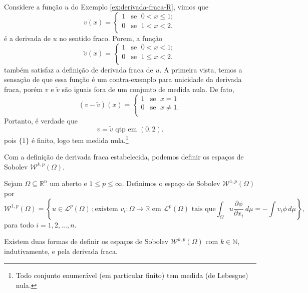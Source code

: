 \documentclass[a4paper, 11pt]{book}
\theoremstyle{definition}
\newcommand{\bN}{\mathbb{N}}
\newcommand{\bR}{\mathbb{R}}
\newcommand{\cL}{\mathcal{L}}
\newcommand{\cW}{\mathcal{W}}
\begin{document}
\begin{ex}
    Considere a função $u$ do Exemplo \ref{ex:derivada-fraca-R}, vimos que
    \[
        v(x) = \left\{
            \begin{array}{rl}
                1 & \text{se }\; 0 < x \leqslant 1;\\
                0 & \text{se }\; 1 < x < 2.\\
            \end{array}
        \right.
    \]
    é a derivada de $u$ no sentido fraco.
    Porem, a função
    \[
        \tilde v(x) = \left\{
            \begin{array}{rl}
                1 & \text{se }\; 0 < x < 1;\\
                0 & \text{se }\; 1 \leqslant x < 2.\\
            \end{array}
        \right.
    \]
    também satisfaz a definição de derivada fraca de $u$.
    A primeira vista, temos a sensação de que essa função é um contra-exemplo para unicidade da derivada fraca, porém $v$ e $\tilde v$ são iguais fora de um conjunto de medida nula.
    De fato,
    \[
        (v - \tilde v)(x) = \left\{
            \begin{array}{rl}
                1 & \text{se }\; x = 1\\
                0 & \text{se }\; x \neq 1.\\
            \end{array}
        \right.
    \]
    Portanto, é verdade que
    \[
        v = \tilde v \text{ qtp em } (0,2).
    \]
    pois $\{1\}$ é finito, logo tem medida nula.\footnote{Todo conjunto enumerável (em particular finito) tem medida (de Lebesgue) nula.}
\end{ex}

Com a definição de derivada fraca estabelecida, podemos definir os espaços de Sobolev $\cW^{k,p}(\Omega)$.

\begin{dbox}
    Sejam $\Omega \subseteq \bR^n$ um aberto e $1 \leqslant p \leqslant \infty$. 
    Definimos o espaço de Sobolev $\cW^{1,p}(\Omega)$ por
    \[
        \cW^{1,p}(\Omega) = \left\{u \in \cL^p(\Omega) \,; \text{existem } v_i : \Omega \to \bR \text{ em $\cL^p(\Omega)$ tais que} \int_\Omega u \dfrac{\partial \phi}{\partial x_i} \, d\mu = -\!\!\int v_i \phi \,d\mu \right\},
    \]
    para todo $i = 1,2,\dots,n$.
\end{dbox}

Existem duas formas de definir os espaços de Sobolev $\cW^{k,p}(\Omega)$ com $k \in \bN$, indutivamente, e pela derivada fraca.
\end{document}
